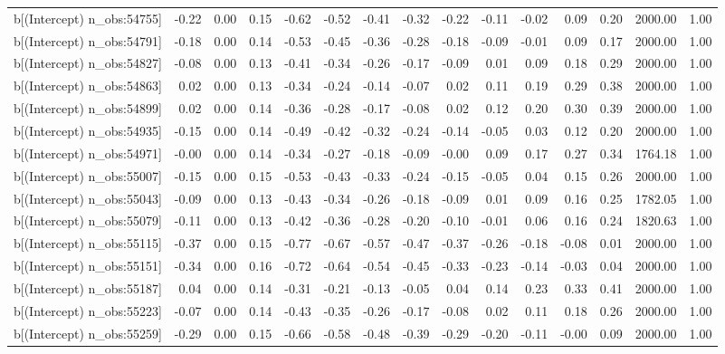 \begin{table}[ht]
\begin{tabular}{rrrrrrrrrrrrrrr}
  b[(Intercept) n\_obs:54755] & -0.22 & 0.00 & 0.15 & -0.62 & -0.52 & -0.41 & -0.32 & -0.22 & -0.11 & -0.02 & 0.09 & 0.20 & 2000.00 & 1.00 \\ 
  b[(Intercept) n\_obs:54791] & -0.18 & 0.00 & 0.14 & -0.53 & -0.45 & -0.36 & -0.28 & -0.18 & -0.09 & -0.01 & 0.09 & 0.17 & 2000.00 & 1.00 \\ 
  b[(Intercept) n\_obs:54827] & -0.08 & 0.00 & 0.13 & -0.41 & -0.34 & -0.26 & -0.17 & -0.09 & 0.01 & 0.09 & 0.18 & 0.29 & 2000.00 & 1.00 \\ 
  b[(Intercept) n\_obs:54863] & 0.02 & 0.00 & 0.13 & -0.34 & -0.24 & -0.14 & -0.07 & 0.02 & 0.11 & 0.19 & 0.29 & 0.38 & 2000.00 & 1.00 \\ 
  b[(Intercept) n\_obs:54899] & 0.02 & 0.00 & 0.14 & -0.36 & -0.28 & -0.17 & -0.08 & 0.02 & 0.12 & 0.20 & 0.30 & 0.39 & 2000.00 & 1.00 \\ 
  b[(Intercept) n\_obs:54935] & -0.15 & 0.00 & 0.14 & -0.49 & -0.42 & -0.32 & -0.24 & -0.14 & -0.05 & 0.03 & 0.12 & 0.20 & 2000.00 & 1.00 \\ 
  b[(Intercept) n\_obs:54971] & -0.00 & 0.00 & 0.14 & -0.34 & -0.27 & -0.18 & -0.09 & -0.00 & 0.09 & 0.17 & 0.27 & 0.34 & 1764.18 & 1.00 \\ 
  b[(Intercept) n\_obs:55007] & -0.15 & 0.00 & 0.15 & -0.53 & -0.43 & -0.33 & -0.24 & -0.15 & -0.05 & 0.04 & 0.15 & 0.26 & 2000.00 & 1.00 \\ 
  b[(Intercept) n\_obs:55043] & -0.09 & 0.00 & 0.13 & -0.43 & -0.34 & -0.26 & -0.18 & -0.09 & 0.01 & 0.09 & 0.16 & 0.25 & 1782.05 & 1.00 \\ 
  b[(Intercept) n\_obs:55079] & -0.11 & 0.00 & 0.13 & -0.42 & -0.36 & -0.28 & -0.20 & -0.10 & -0.01 & 0.06 & 0.16 & 0.24 & 1820.63 & 1.00 \\ 
  b[(Intercept) n\_obs:55115] & -0.37 & 0.00 & 0.15 & -0.77 & -0.67 & -0.57 & -0.47 & -0.37 & -0.26 & -0.18 & -0.08 & 0.01 & 2000.00 & 1.00 \\ 
  b[(Intercept) n\_obs:55151] & -0.34 & 0.00 & 0.16 & -0.72 & -0.64 & -0.54 & -0.45 & -0.33 & -0.23 & -0.14 & -0.03 & 0.04 & 2000.00 & 1.00 \\ 
  b[(Intercept) n\_obs:55187] & 0.04 & 0.00 & 0.14 & -0.31 & -0.21 & -0.13 & -0.05 & 0.04 & 0.14 & 0.23 & 0.33 & 0.41 & 2000.00 & 1.00 \\ 
  b[(Intercept) n\_obs:55223] & -0.07 & 0.00 & 0.14 & -0.43 & -0.35 & -0.26 & -0.17 & -0.08 & 0.02 & 0.11 & 0.18 & 0.26 & 2000.00 & 1.00 \\ 
  b[(Intercept) n\_obs:55259] & -0.29 & 0.00 & 0.15 & -0.66 & -0.58 & -0.48 & -0.39 & -0.29 & -0.20 & -0.11 & -0.00 & 0.09 & 2000.00 & 1.00 \\ 

\end{tabular}
\end{table}
